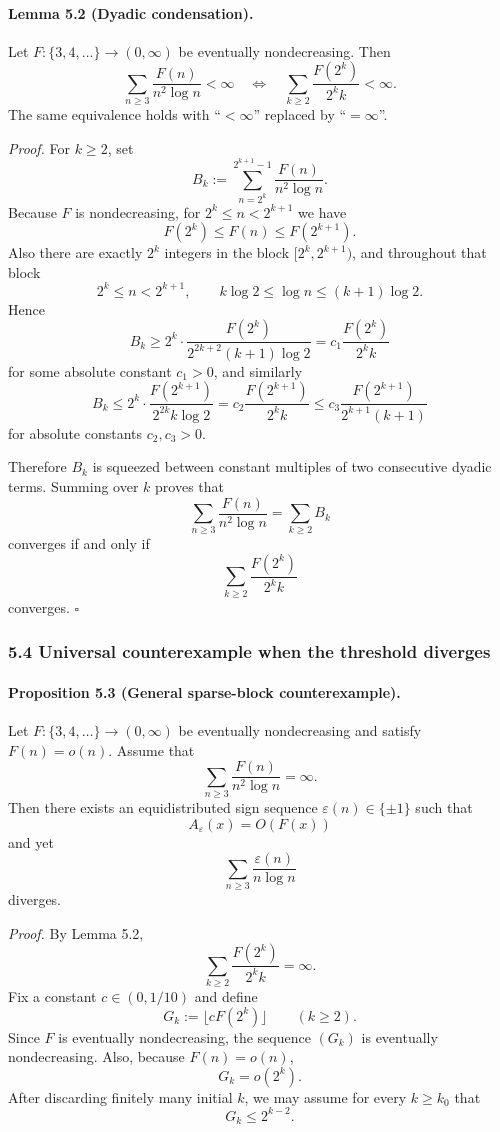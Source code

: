 \paragraph{Lemma 5.2 (Dyadic condensation).}
Let $F:\{3,4,\dots\}\to (0,\infty)$ be eventually nondecreasing. Then
\[
\sum_{n\ge 3}\frac{F(n)}{n^2\log n}<\infty
\quad\Longleftrightarrow\quad
\sum_{k\ge 2}\frac{F(2^k)}{2^k k}<\infty.
\]
The same equivalence holds with ``$<\infty$'' replaced by ``$=\infty$''.


\emph{Proof.}
For $k\ge 2$, set
\[
B_k:=\sum_{n=2^k}^{2^{k+1}-1}\frac{F(n)}{n^2\log n}.
\]
Because $F$ is nondecreasing, for $2^k\le n<2^{k+1}$ we have
\[
F(2^k)\le F(n)\le F(2^{k+1}).
\]
Also there are exactly $2^k$ integers in the block $[2^k,2^{k+1})$, and throughout that block
\[
2^k\le n<2^{k+1},
\qquad
k\log 2\le \log n\le (k+1)\log 2.
\]
Hence
\[
B_k
\ge
2^k\cdot \frac{F(2^k)}{2^{2k+2}(k+1)\log 2}
= c_1\frac{F(2^k)}{2^k k}
\tag{5.5}
\]
for some absolute constant $c_1>0$, and similarly
\[
B_k
\le
2^k\cdot \frac{F(2^{k+1})}{2^{2k}k\log 2}
= c_2\frac{F(2^{k+1})}{2^k k}
\le c_3\frac{F(2^{k+1})}{2^{k+1}(k+1)}
\tag{5.6}
\]
for absolute constants $c_2,c_3>0$.

Therefore $B_k$ is squeezed between constant multiples of two consecutive dyadic terms.  Summing over $k$ proves that
\[
\sum_{n\ge 3}\frac{F(n)}{n^2\log n}
= \sum_{k\ge 2} B_k
\]
converges if and only if
\[
\sum_{k\ge 2}\frac{F(2^k)}{2^k k}
\]
converges.
\hfill$\square$

\subsubsection{5.4 Universal counterexample when the threshold diverges}

\paragraph{Proposition 5.3 (General sparse-block counterexample).}
Let $F:\{3,4,\dots\}\to (0,\infty)$ be eventually nondecreasing and satisfy $F(n)=o(n)$.  Assume that
\[
\sum_{n\ge 3}\frac{F(n)}{n^2\log n}=\infty.
\]
Then there exists an equidistributed sign sequence $\varepsilon(n)\in\{\pm 1\}$ such that
\[
A_\varepsilon(x)=O(F(x))
\]
and yet
\[
\sum_{n\ge 3}\frac{\varepsilon(n)}{n\log n}
\]
diverges.


\emph{Proof.}
By Lemma 5.2,
\[
\sum_{k\ge 2}\frac{F(2^k)}{2^k k}=\infty.
\tag{5.7}
\]
Fix a constant $c\in(0,1/10)$ and define
\[
G_k:=\bigl\lfloor cF(2^k)\bigr\rfloor \qquad (k\ge 2).
\]
Since $F$ is eventually nondecreasing, the sequence $(G_k)$ is eventually nondecreasing.  Also, because $F(n)=o(n)$,
\[
G_k=o(2^k).
\tag{5.8}
\]
After discarding finitely many initial $k$, we may assume for every $k\ge k_0$ that
\[
G_k\le 2^{k-2}.
\tag{5.9}
\]

